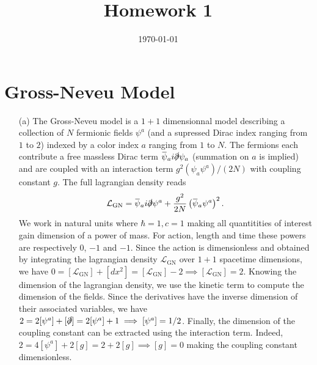 \documentclass[10pt, a4paper]{article}
\title{Homework 1} %
\author{\PA} %
\date{\today} %
\begin{document}
\maketitlepage

\maketableofcontents




\section{Gross-Neveu Model}

\begin{enumerate}
  \item[(a)] The Gross-Neveu model is a $1+1$ dimensionnal model describing a collection of $N$ fermionic fields $\psi^a$ (and a supressed Dirac index ranging from $1$ to $2$) indexed by a color index $a$ ranging from $1$ to $N$. The fermions each contribute a free massless Dirac term $\bar{\psi}_a i \slashed{\partial} \psi_a$ (summation on $a$ is implied) and are coupled with an interaction term $g^2 (\psi_a \psi^a)/(2N)$ with coupling constant $g$. The full lagrangian density reads
  \begin{align*}
    \mathcal{L}_{\mathrm{GN}}=\bar{\psi}_a i \slashed{\partial} \psi^a+\frac{g^2}{2 N}\left(\bar{\psi}_a \psi^a\right)^2. 
  \end{align*}
  We work in natural units where $\hbar = 1, c = 1$ making all quantitities of interest gain dimension of a power of mass. For action, length and time these powers are respectively $0$, $-1$ and $-1$. Since the action is dimensionless and obtained by integrating the lagrangian density $\mathcal{L}_{\mathrm{GN}}$ over $1+1$ spacetime dimensions, we have $0 = [\mathcal{L}_{\mathrm{GN}}] +  [dx^2] = [\mathcal{L}_{\mathrm{GN}}] - 2 \implies [\mathcal{L}_{\mathrm{GN}}] = 2$. Knowing the dimension of the lagrangian density, we use the kinetic term to compute the dimension of the fields. Since the derivatives have the inverse dimension of their associated variables, we have $2 = 2[\psi^a] + [\slashed{\partial}] = 2[\psi^a] + 1 \implies [\psi^a] = 1/2$. Finally, the dimension of the coupling constant can be extracted using the interaction term. Indeed,  $2 = 4 [\psi^a] + 2 [g] = 2 + 2 [g] \implies [g] = 0$ making the coupling constant dimensionless. 

\end{enumerate}
\end{document}
